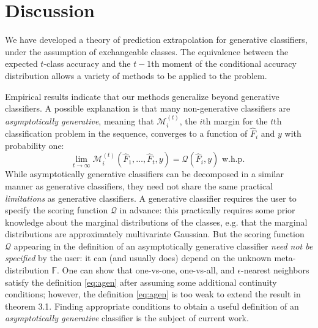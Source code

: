 \documentclass{article}
\begin{document}

\section{Discussion}

We have developed a theory of prediction extrapolation for generative classifiers,
under the assumption of exchangeable classes.  The equivalence between
the expected $t$-class accuracy and the $t-1$th moment of the conditional accuracy distribution
allows a variety of methods to be applied to the problem.  

Empirical results indicate that our methods generalize beyond generative classifiers.
A possible explanation is that many non-generative classifiers are \emph{asymptotically generative},
meaning that $\mathcal{M}_i^{(t)}$, the $i$th margin for the $t$th classification problem in the sequence,
converges to a function of $\hat{F}_i$ and $y$ with probability one:
\begin{equation}\label{eq:agen}
\lim_{t \to \infty} \mathcal{M}_i^{(t)}(\hat{F}_1,\hdots, \hat{F}_t, y) = \mathcal{Q}(\hat{F}_i, y) \text{ w.h.p. }
\end{equation}
While asymptotically generative classifiers can be decomposed in a similar manner as generative classifiers,
they need not share the same practical \emph{limitations} as generative classifiers.
A generative classifier requires the user to specify the scoring function $\mathcal{Q}$ in advance:
this practically requires some prior knowledge about the marginal distributions of the classes,
e.g. that the marginal distributions are approximately multivariate Gaussian.
But the scoring function $\mathcal{Q}$ appearing in the definition of an asymptotically generative classifier
\emph{need not be specified} by the user: 
it can (and usually does) depend on the unknown meta-distribution $\mathbb{F}$.
One can show that one-vs-one, one-vs-all, and $\epsilon$-nearest neighbors satisfy the definition \eqref{eq:agen}
after assuming some additional continuity conditions; however, the definition \eqref{eq:agen} is too weak
to extend the result in theorem 3.1.  Finding appropriate conditions to obtain a useful
definition of an \emph{asymptotically generative} classifier is the subject of current work.
\end{document}
